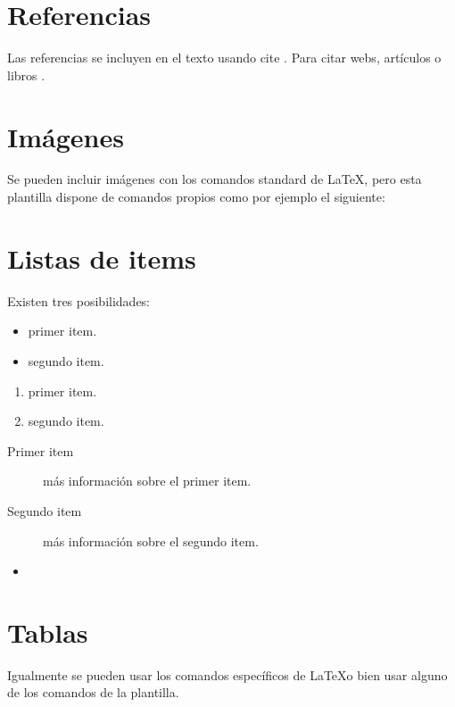\section{Referencias}

Las referencias se incluyen en el texto usando cite \cite{wiki:latex}. Para citar webs, artículos o libros \cite{koza92}.


\section{Imágenes}

Se pueden incluir imágenes con los comandos standard de \LaTeX, pero esta plantilla dispone de comandos propios como por ejemplo el siguiente:




\section{Listas de items}

Existen tres posibilidades:

\begin{itemize}
	\item primer item.
	\item segundo item.
\end{itemize}

\begin{enumerate}
	\item primer item.
	\item segundo item.
\end{enumerate}

\begin{description}
	\item[Primer item] más información sobre el primer item.
	\item[Segundo item] más información sobre el segundo item.
\end{description}
	
\begin{itemize}
\item 
\end{itemize}

\section{Tablas}

Igualmente se pueden usar los comandos específicos de \LaTeX o bien usar alguno de los comandos de la plantilla.

